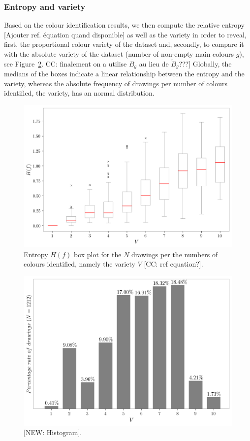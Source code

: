 \documentclass[11pt,a4paper]{article}
\begin{document}
\subsubsection{Entropy and variety}
Based on the colour identification results, we then compute the relative entropy {\color{red}[Ajouter ref. \'equation quand disponible]} as well as the variety in order to reveal, first, the proportional colour variety of the dataset and, secondly, to compare it with the absolute variety of the dataset (number of non-empty main colours $g$), see Figure~\ref{fig:boxplotvariety}. {\color{red} CC: finalement on a utilise $B_{g}$ au lieu de $\tilde{B}_g$???]}
Globally, the medians of the boxes indicate a linear  relationship between the entropy and the variety, whereas the absolute frequency of drawings per number of colours identified, the variety, has an normal distribution.

\begin{figure}[h!]
	\centering
	\includegraphics[width=\linewidth]{figures/colors-boxplot.png}
	\caption{Entropy $H(f)$ box plot for the $N$ drawings per the numbers of colours identified, namely the variety $V$ {\color{red}[CC: ref equation?]}.}
	\label{fig:boxplotvariety}
\end{figure}

\begin{figure}[h!]
	\centering
	\includegraphics[width=\linewidth]{figures/colors-boxplot-hist.png}
	\caption{{\color{red}[NEW: Histogram]}.}
	\label{fig:boxplotvariety}
\end{figure}
\end{document}
